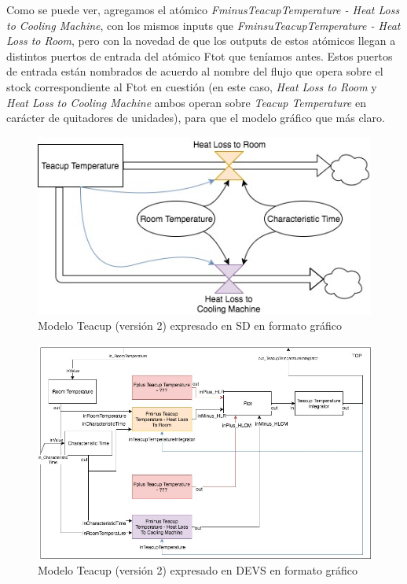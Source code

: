 Como se puede ver, agregamos el atómico \textit{FminusTeacupTemperature - Heat Loss to Cooling Machine}, con los mismos inputs que \textit{FminsuTeacupTemperature - Heat Loss to Room}, pero con la novedad de que los outputs de estos atómicos llegan a distintos puertos de entrada del atómico Ftot que teníamos antes. Estos puertos de entrada están nombrados de acuerdo al nombre del flujo que opera sobre el stock correspondiente al Ftot en cuestión (en este caso, \textit{Heat Loss to Room} y \textit{Heat Loss to Cooling Machine} ambos operan sobre \textit{Teacup Temperature} en carácter de quitadores de unidades), para que el modelo gráfico que más claro.

\begin{figure}[!h]
\centering
\includegraphics[scale=0.4]{imagenes/Teacup_sd_2}
\caption{Modelo Teacup (versión 2) expresado en SD en formato gráfico}
\label{fig:Teacup_sd_2}
\end{figure}

\begin{figure}[!h]
\centering
\includegraphics[scale=0.4]{imagenes/Teacup_devs_flattened_2}
\caption{Modelo Teacup (versión 2) expresado en DEVS en formato gráfico}
\label{fig:Teacup_devs_flattened_2}
\end{figure}

